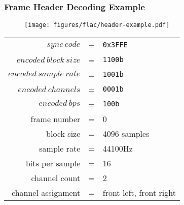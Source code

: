 \subsubsection{Frame Header Decoding Example}
\begin{figure}[h]
\texttt{[image: figures/flac/header-example.pdf]}
\end{figure}
{
\begin{tabular}{rcl}
$sync~code$ & = & \texttt{0x3FFE} \\
$encoded~block~size$ & = & \texttt{1100b} \\
$encoded~sample~rate$ & = & \texttt{1001b} \\
$encoded~channels$ & = & \texttt{0001b} \\
$encoded~bps$ & = & \texttt{100b} \\
frame number & = & 0 \\
block size & = & 4096 samples \\
sample rate & = & 44100Hz \\
bits per sample & = & 16 \\
channel count & = & 2 \\
channel assignment & = & front left, front right
\end{tabular}
}
